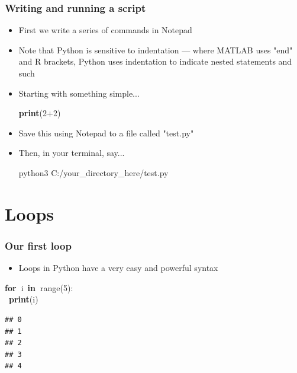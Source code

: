 \documentclass{beamer}\usepackage[]{graphicx}\usepackage[]{color}
\makeatletter
\newcommand{\hlnum}[1]{\textcolor[rgb]{0.686,0.059,0.569}{#1}}%
\newcommand{\hlopt}[1]{\textcolor[rgb]{0,0,0}{#1}}%
\newcommand{\hlstd}[1]{\textcolor[rgb]{0.345,0.345,0.345}{#1}}%
\newcommand{\hlkwa}[1]{\textcolor[rgb]{0.161,0.373,0.58}{\textbf{#1}}}%
\newcommand{\hlkwb}[1]{\textcolor[rgb]{0.69,0.353,0.396}{#1}}%
\newenvironment{kframe}{%
 \def\at@end@of@kframe{}%
 \ifinner\ifhmode%
  \def\at@end@of@kframe{\end{minipage}}%
  \begin{minipage}{\columnwidth}%
 \fi\fi%
 \def\FrameCommand##1{\hskip\@totalleftmargin \hskip-\fboxsep
 \colorbox{shadecolor}{##1}\hskip-\fboxsep
     \hskip-\linewidth \hskip-\@totalleftmargin \hskip\columnwidth}%
 \MakeFramed {\advance\hsize-\width
   \@totalleftmargin\z@ \linewidth\hsize
   \@setminipage}}%
 {\par\unskip\endMakeFramed%
 \at@end@of@kframe}
\newenvironment{knitrout}{}{} %
\makeatother
\begin{document}
\begin{frame}
\frametitle{Writing and running a script}
\begin{itemize}
	\item First we write a series of commands in Notepad

	\item Note that Python is sensitive to indentation --- where MATLAB uses "end" and R brackets, Python uses indentation to indicate nested statements and such

	\item Starting with something simple...

\begin{knitrout}
\color{fgcolor}\begin{kframe}
\noindent
\ttfamily
\hlstd{}\hlkwa{print}\hlstd{}\hlopt{(}\hlstd{}\hlnum{2}\hlstd{}\hlopt{+}\hlstd{}\hlnum{2}\hlstd{}\hlopt{)}\hlstd{}\hspace*{\fill}
\mbox{}
\normalfont
\end{kframe}
\end{knitrout}

	\item Save this using Notepad to a file called "test.py"

	\item Then, in your terminal, say...
	
	python3 C:/your\_directory\_here/test.py
\end{itemize}
\end{frame}

\section{Loops}

\begin{frame}[fragile]
\frametitle{Our first loop}
\begin{itemize}
	\item Loops in Python have a very easy and powerful syntax

\end{itemize}
\begin{knitrout}
\color{fgcolor}\begin{kframe}
\noindent
\ttfamily
\hlstd{}\hlkwa{for\ }\hlstd{i\ }\hlkwa{in\ }\hlstd{}\hlkwb{range}\hlstd{}\hlopt{(}\hlstd{}\hlnum{5}\hlstd{}\hlopt{):}\hspace*{\fill}\\
\hlstd{\ }\hlkwa{print}\hlstd{}\hlopt{(}\hlstd{i}\hlopt{)}\hlstd{}\hspace*{\fill}
\mbox{}
\normalfont

\begin{verbatim}
## 0
## 1
## 2
## 3
## 4
\end{verbatim}
\end{kframe}
\end{knitrout}

\end{frame}
\end{document}
